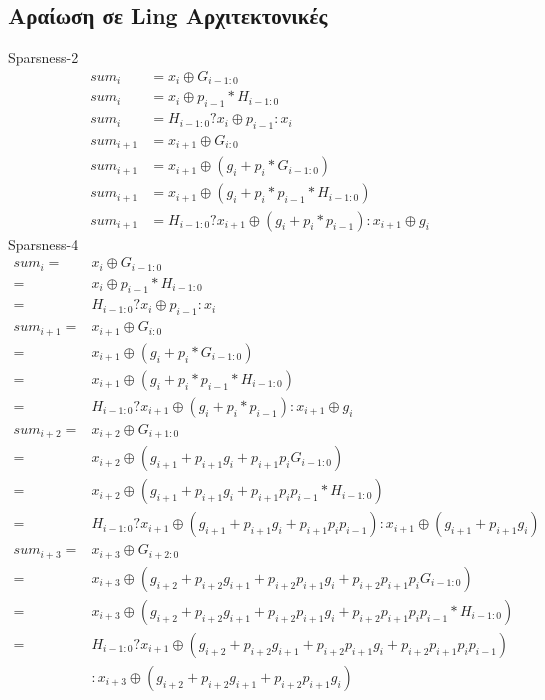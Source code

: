  \subsection{Αραίωση σε Ling Αρχιτεκτονικές}
Sparsness-2
\begin{equation*}
    \begin{split}
        sum_i &= x_i \oplus G_{i-1:0}\\
        sum_i &= x_i \oplus p_{i-1}*H_{i-1:0}\\
        sum_i &= H_{i-1:0} ? x_i \oplus p_{i-1} : x_i\\
        sum_{i+1} &= x_{i+1} \oplus G_{i:0}\\
        sum_{i+1} &= x_{i+1} \oplus (g_i + p_i*G_{i-1:0})\\
        sum_{i+1} &= x_{i+1} \oplus (g_i + p_i*p_{i-1}*H_{i-1:0})\\
        sum_{i+1} &= H_{i-1:0} ? x_{i+1} \oplus (g_i + p_i*p_{i-1}) : x_{i+1} \oplus g_i
    \end{split} 
\end{equation*}
Sparsness-4
\begin{equation*}
    \begin{split}
        sum_i =& x_i \oplus G_{i-1:0}\\
        =& x_i \oplus p_{i-1}*H_{i-1:0}\\
        =& H_{i-1:0} ? x_i \oplus p_{i-1} : x_i\\
        sum_{i+1} =& x_{i+1} \oplus G_{i:0}\\
        =& x_{i+1} \oplus (g_i + p_i*G_{i-1:0})\\
        =& x_{i+1} \oplus (g_i + p_i*p_{i-1}*H_{i-1:0})\\
        =& H_{i-1:0} ? x_{i+1} \oplus (g_i + p_i*p_{i-1}) : x_{i+1} \oplus g_i\\
        sum_{i+2} =& x_{i+2} \oplus G_{i+1:0}\\
        =& x_{i+2} \oplus (g_{i+1} + p_{i+1}g_i + p_{i+1}p_iG_{i-1:0})\\
        =& x_{i+2} \oplus (g_{i+1} + p_{i+1}g_i + p_{i+1}p_ip_{i-1}*H_{i-1:0})\\
        =& H_{i-1:0} ? x_{i+1} \oplus (g_{i+1} + p_{i+1}g_i + p_{i+1}p_ip_{i-1}) : x_{i+1} \oplus (g_{i+1} + p_{i+1}g_i)\\
        sum_{i+3} =& x_{i+3} \oplus G_{i+2:0}\\
        =& x_{i+3} \oplus (g_{i+2} + p_{i+2}g_{i+1} + p_{i+2}p_{i+1}g_i + p_{i+2}p_{i+1}p_iG_{i-1:0})\\
        =& x_{i+3} \oplus (g_{i+2} + p_{i+2}g_{i+1} + p_{i+2}p_{i+1}g_i + p_{i+2}p_{i+1}p_ip_{i-1}*H_{i-1:0})\\
        =& H_{i-1:0} ? x_{i+1} \oplus (g_{i+2} + p_{i+2}g_{i+1} + p_{i+2}p_{i+1}g_i + p_{i+2}p_{i+1}p_ip_{i-1}) \\&: x_{i+3} \oplus (g_{i+2} + p_{i+2}g_{i+1} + p_{i+2}p_{i+1}g_i)
    \end{split} 
\end{equation*}

 
 